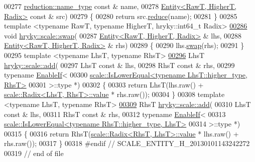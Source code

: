 \begin{DoxyCode}
00277     \hyperlink{classhryky_1_1reduction_1_1_string}{reduction::name_type} \textcolor{keyword}{const} & name,
00278     \hyperlink{classhryky_1_1scale_1_1_entity}{Entity<RawT, HigherT, Radix>} \textcolor{keyword}{const} & src)
00279 \{
00280     \textcolor{keywordflow}{return} src.\hyperlink{classhryky_1_1scale_1_1_entity_aa745d5ef4401aa7f06ba72b91d06a3df}{reduce}(name);
00281 \}
00285 \textcolor{keyword}{template} <\textcolor{keyword}{typename} RawT, \textcolor{keyword}{typename} HigherT, hryky::\textcolor{keywordtype}{int}64\_t Radix>
\hypertarget{scale__entity_8h_source_l00286}{}\hyperlink{namespacehryky_1_1scale_ae4a4f26481f5a12c26e0d3c93f1d1bbc}{00286} \textcolor{keywordtype}{void} \hyperlink{namespacehryky_1_1scale_ae4a4f26481f5a12c26e0d3c93f1d1bbc}{hryky::scale::swap}(
00287     \hyperlink{classhryky_1_1scale_1_1_entity}{Entity<RawT, HigherT, Radix>} & lhs,
00288     \hyperlink{classhryky_1_1scale_1_1_entity}{Entity<RawT, HigherT, Radix>} & rhs)
00289 \{
00290     lhs.\hyperlink{classhryky_1_1scale_1_1_entity_a8ec8cc49ba0fd7e19cfe2ed714d62663}{swap}(rhs);
00291 \}
00295 \textcolor{keyword}{template} <\textcolor{keyword}{typename} LhsT, \textcolor{keyword}{typename} RhsT>
\hypertarget{scale__entity_8h_source_l00296}{}\hyperlink{namespacehryky_1_1scale_ac2fe4df99c737fa954907b456a705f75}{00296} LhsT \hyperlink{namespacehryky_1_1scale_ac2fe4df99c737fa954907b456a705f75}{hryky::scale::add}(
00297     LhsT \textcolor{keyword}{const} & lhs,
00298     RhsT \textcolor{keyword}{const} & rhs,
00299     \textcolor{keyword}{typename} \hyperlink{classhryky_1_1_enable_if}{EnableIf}<
00300         \hyperlink{classhryky_1_1scale_1_1_is_lower_equal}{scale::IsLowerEqual<typename LhsT::higher_type, RhsT>}
00301     >::type *)
00302 \{
00303     \textcolor{keywordflow}{return} LhsT(lhs.raw() + \hyperlink{classhryky_1_1scale_1_1_radix}{scale::Radix<LhsT, RhsT>::value} * rhs.raw());
00304 \}
00308 \textcolor{keyword}{template} <\textcolor{keyword}{typename} LhsT, \textcolor{keyword}{typename} RhsT>
\hypertarget{scale__entity_8h_source_l00309}{}\hyperlink{namespacehryky_1_1scale_ad9e9b8df1f0e41c8de221227e2ea1a8f}{00309} RhsT \hyperlink{namespacehryky_1_1scale_ac2fe4df99c737fa954907b456a705f75}{hryky::scale::add}(
00310     LhsT \textcolor{keyword}{const} & lhs,
00311     RhsT \textcolor{keyword}{const} & rhs,
00312     \textcolor{keyword}{typename} \hyperlink{classhryky_1_1_enable_if}{EnableIf}<
00313         \hyperlink{classhryky_1_1scale_1_1_is_lower_equal}{scale::IsLowerEqual<typename RhsT::higher_type, LhsT>}
00314     >::type *)
00315 \{
00316     \textcolor{keywordflow}{return} RhsT(\hyperlink{classhryky_1_1scale_1_1_radix}{scale::Radix<RhsT, LhsT>::value} * lhs.raw() + rhs.raw());
00317 \}
00318 \textcolor{preprocessor}{#endif // SCALE\_ENTITY\_H\_20130101143242272}
00319 \textcolor{preprocessor}{}\textcolor{comment}{// end of file}
\end{DoxyCode}
